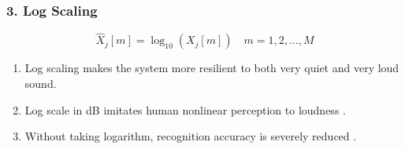 
\begin{frame}
\frametitle{3. Log Scaling}
\begin{equation}
\hat{X}_j[m] = \log_{10}(X_j[m]) \quad m = 1, 2, \dots, M
\end{equation}

\begin{enumerate}
\item Log scaling makes the system more resilient to both very quiet and very loud sound.
\item Log scale in dB imitates human nonlinear perception to loudness \cite{farin2008mathematical}.
\item Without taking logarithm, recognition accuracy is severely reduced \cite{tan2008automatic}.
\end{enumerate}
\end{frame}
